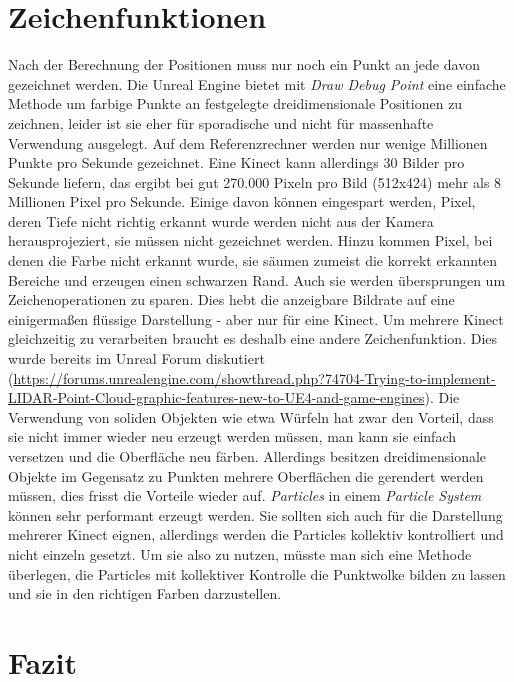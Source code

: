 \documentclass[a4paper]{IEEEtran}
\begin{document}
\section{Zeichenfunktionen}
	Nach der Berechnung der Positionen muss nur noch ein Punkt an jede davon gezeichnet werden. 
	Die Unreal Engine bietet mit {\textit{Draw Debug Point}} eine einfache Methode um farbige Punkte an festgelegte dreidimensionale Positionen zu zeichnen, leider ist sie eher für sporadische und nicht für massenhafte Verwendung ausgelegt. 
	Auf dem Referenzrechner werden nur wenige Millionen Punkte pro Sekunde gezeichnet. 
	Eine Kinect kann allerdings 30 Bilder pro Sekunde liefern, das ergibt bei gut 270.000 Pixeln pro Bild (512x424) mehr als 8 Millionen Pixel pro Sekunde. 
	Einige davon können eingespart werden, Pixel, deren Tiefe nicht richtig erkannt wurde werden nicht aus der Kamera herausprojeziert, sie müssen nicht gezeichnet werden. 
	Hinzu kommen Pixel, bei denen die Farbe nicht erkannt wurde, sie säumen zumeist die korrekt erkannten Bereiche und erzeugen einen schwarzen Rand. 
	Auch sie werden übersprungen um Zeichenoperationen zu sparen. 
	Dies hebt die anzeigbare Bildrate auf eine einigermaßen flüssige Darstellung - aber nur für eine Kinect. 
	Um mehrere Kinect gleichzeitig zu verarbeiten braucht es deshalb eine andere Zeichenfunktion.
	Dies wurde bereits im Unreal Forum diskutiert ({\url{https://forums.unrealengine.com/showthread.php?74704-Trying-to-implement-LIDAR-Point-Cloud-graphic-features-new-to-UE4-and-game-engines}}).
	Die Verwendung von soliden Objekten wie etwa Würfeln hat zwar den Vorteil, dass sie nicht immer wieder neu erzeugt werden müssen, man kann sie einfach versetzen und die Oberfläche neu färben. 
	Allerdings besitzen dreidimensionale Objekte im Gegensatz zu Punkten mehrere Oberflächen die gerendert werden müssen, dies frisst die Vorteile wieder auf.
	{\textit{Particles}} in einem {\textit{Particle System}} können sehr performant erzeugt werden. 
	Sie sollten sich auch für die Darstellung mehrerer Kinect eignen, allerdings werden die Particles kollektiv kontrolliert und nicht einzeln gesetzt. 
	Um sie also zu nutzen, müsste man sich eine Methode überlegen, die Particles mit kollektiver Kontrolle die Punktwolke bilden zu lassen und sie in den richtigen Farben darzustellen. 
	

\section{Fazit}




\end{document}
